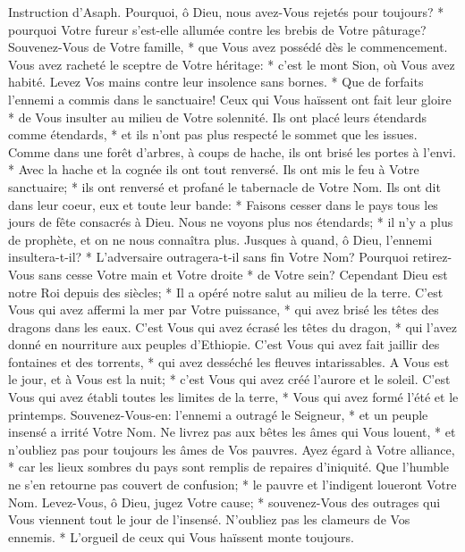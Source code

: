 Instruction d'Asaph. Pourquoi, ô Dieu, nous avez-Vous rejetés pour toujours? * pourquoi Votre fureur s'est-elle allumée contre les brebis de Votre pâturage?
Souvenez-Vous de Votre famille, * que Vous avez possédé dès le commencement. Vous avez racheté le sceptre de Votre héritage: * c'est le mont Sion, où Vous avez habité.
Levez Vos mains contre leur insolence sans bornes. * Que de forfaits l'ennemi a commis dans le sanctuaire!
Ceux qui Vous haïssent ont fait leur gloire * de Vous insulter au milieu de Votre solennité. Ils ont placé leurs étendards comme étendards, *
et ils n'ont pas plus respecté le sommet que les issues. Comme dans une forêt d'arbres, à coups de hache,
ils ont brisé les portes à l'envi. * Avec la hache et la cognée ils ont tout renversé.
Ils ont mis le feu à Votre sanctuaire; * ils ont renversé et profané le tabernacle de Votre Nom.
Ils ont dit dans leur coeur, eux et toute leur bande: * Faisons cesser dans le pays tous les jours de fête consacrés à Dieu.
Nous ne voyons plus nos étendards; * il n'y a plus de prophète, et on ne nous connaîtra plus.
Jusques à quand, ô Dieu, l'ennemi insultera-t-il? * L'adversaire outragera-t-il sans fin Votre Nom?
Pourquoi retirez-Vous sans cesse Votre main et Votre droite * de Votre sein?
Cependant Dieu est notre Roi depuis des siècles; * Il a opéré notre salut au milieu de la terre.
C'est Vous qui avez affermi la mer par Votre puissance, * qui avez brisé les têtes des dragons dans les eaux.
C'est Vous qui avez écrasé les têtes du dragon, * qui l'avez donné en nourriture aux peuples d'Ethiopie.
C'est Vous qui avez fait jaillir des fontaines et des torrents, * qui avez desséché les fleuves intarissables.
A Vous est le jour, et à Vous est la nuit; * c'est Vous qui avez créé l'aurore et le soleil.
C'est Vous qui avez établi toutes les limites de la terre, * Vous qui avez formé l'été et le printemps.
Souvenez-Vous-en: l'ennemi a outragé le Seigneur, * et un peuple insensé a irrité Votre Nom.
Ne livrez pas aux bêtes les âmes qui Vous louent, * et n'oubliez pas pour toujours les âmes de Vos pauvres.
Ayez égard à Votre alliance, * car les lieux sombres du pays sont remplis de repaires d'iniquité.
Que l'humble ne s'en retourne pas couvert de confusion; * le pauvre et l'indigent loueront Votre Nom.
Levez-Vous, ô Dieu, jugez Votre cause; * souvenez-Vous des outrages qui Vous viennent tout le jour de l'insensé.
N'oubliez pas les clameurs de Vos ennemis. * L'orgueil de ceux qui Vous haïssent monte toujours.

